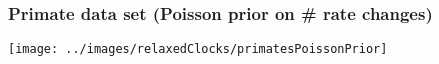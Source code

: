 \begin{frame}
\frametitle{Primate data set (Poisson prior on \# rate changes)}

\begin{centering}

\texttt{[image: ../images/relaxedClocks/primatesPoissonPrior]}

\end{centering}

\end{frame}